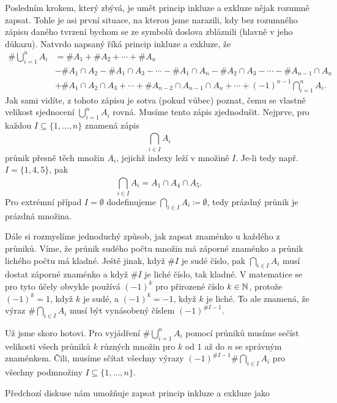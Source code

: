 Posledním krokem, který zbývá, je umět princip inkluze a exkluze nějak rozumně
zapsat. Tohle je asi první situace, na kterou jsme narazili, kdy bez rozumného
zápisu daného tvrzení bychom se ze symbolů doslova zbláznili (hlavně v jeho
důkazu). Natvrdo napsaný říká princip inkluze a exkluze, že
\begin{align*}
 \# \bigcup_{i=1}^{n} A_i &= \# A_1 + \# A_2 + \cdots + \# A_n\\
 &- \# A_1 \cap A_2 - \# A_1 \cap A_3 - \cdots - \# A_1 \cap A_n - \# A_2
 \cap A_3 - \cdots - \# A_{n-1} \cap A_n\\
 &+ \# A_1 \cap A_2 \cap A_3 + \cdots + \# A_{n-2} \cap A_{n-1} \cap A_n +
 \cdots + (-1)^{n-1} \bigcap_{i=1}^{n} A_i.
\end{align*}
Jak sami vidíte, z tohoto zápisu je sotva (pokud vůbec) poznat, čemu se vlastně
velikost sjednocení $\bigcup_{i=1}^{n} A_i$ rovná. Musíme tento zápis
zjednodušit. Nejprve, pro každou $I \subseteq \{1,\ldots,n\}$ znamená zápis
\[
 \bigcap_{i \in I}^{} A_i
\]
průnik přesně těch množin $A_i$, jejichž indexy leží v množině $I$. Je-li tedy
např. $I = \{1,4,5\}$, pak
\[
 \bigcap_{i  \in I}^{} A_i = A_1 \cap A_4 \cap A_5.
\]
Pro extrémní případ $I = \emptyset$ dodefinujeme $\bigcap_{i \in  I}^{}A_i
\coloneqq \emptyset$, tedy prázdný průnik je prázdná množina.

Dále si rozmyslíme jednoduchý způsob, jak zapsat znaménko u každého z průniků.
Víme, že průnik sudého počtu množin má záporné znaménko a průnik lichého počtu
má kladné. Ještě jinak, když $\# I$ je sudé číslo, pak $\bigcap_{i \in  I}^{}
A_i$ musí dostat záporné znaménko a když $\# I$ je liché číslo, tak kladné. V
matematice se pro tyto účely obvykle používá $(-1)^{k}$ pro přirozené číslo $k
\in \mathbb{N}$, protože $(-1)^{k}=1$, když $k$ je sudé, a $(-1)^{k} = -1$, když $k$ je
liché. To ale znamená, že výraz $\# \bigcap_{i \in  I}^{} A_i$ musí být
vynásobený číslem $(-1)^{\# I-1}$.

Už jsme skoro hotovi. Pro vyjádření $\# \bigcup_{i=1}^{n} A_i$ pomocí průniků
musíme sečíst velikosti všech průniků $k$ různých množin pro $k$ od $1$ až do
$n$ se správným znaménkem. Čili, musíme sčítat všechny výrazy $(-1)^{\# I - 1}\#
\bigcap_{i \in  I}^{} A_i$ pro všechny podmnožiny $I \subseteq \{1,\ldots,n\}$.

Předchozí diskuse nám umožňuje zapsat princip inkluze a exkluze jako
